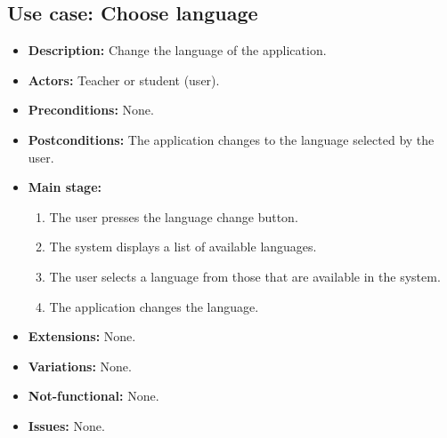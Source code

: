 \subsection{Use case: Choose language}
\begin{itemize}
	\item \textbf{Description:} Change the language of the application.
	\item \textbf{Actors:} Teacher or student (user).
	\item \textbf{Preconditions:} None. %
	\item \textbf{Postconditions:} The application changes to the language selected by the user.
	\item \textbf{Main stage:}
	\begin{enumerate}
		\item The user presses the language change button.
		\item The system displays a list of available languages.
		\item The user selects a language from those that are available in the system.
		\item The application changes the language.
	\end{enumerate}
	\item \textbf{Extensions:} None.
	\item \textbf{Variations:} None.
	\item \textbf{Not-functional:} None.
	\item \textbf{Issues:} None.
\end{itemize}

